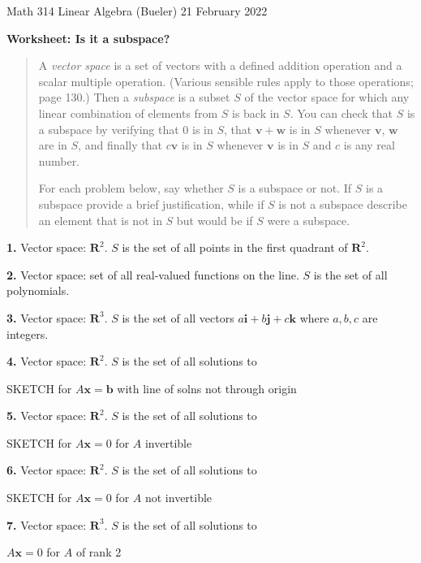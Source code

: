 \documentclass[12pt]{amsart}
\newcommand{\bb}{\mathbf{b}}
\newcommand{\bi}{\mathbf{i}}
\newcommand{\bj}{\mathbf{j}}
\newcommand{\bk}{\mathbf{k}}
\newcommand{\bv}{\mathbf{v}}
\newcommand{\bw}{\mathbf{w}}
\newcommand{\bx}{\mathbf{x}}
\newcommand{\RR}{\mathbf{R}}
\newcommand{\prob}[1]{\bigskip\noindent\textbf{#1.}\quad }
\begin{document}
\scriptsize \noindent Math 314 Linear Algebra (Bueler) \hfill 21 February 2022 
\normalsize\medskip

\Large\centerline{\textbf{Worksheet: Is it a subspace?}}
\medskip
\normalsize

\thispagestyle{empty}
\begin{quote}
A \emph{vector space} is a set of vectors with a defined addition operation and a scalar multiple operation.  (Various sensible rules apply to those operations; page 130.)  Then a \emph{subspace} is a subset $S$ of the vector space for which any linear combination of elements from $S$ is back in $S$.  You can check that $S$ is a subspace by verifying that $0$ is in $S$, that $\bv+\bw$ is in $S$ whenever $\bv$, $\bw$ are in $S$, and finally that $c\bv$ is in $S$ whenever $\bv$ is in $S$ and $c$ is any real number.

For each problem below, say whether $S$ is a subspace or not.  If $S$ is a subspace provide a brief justification, while if $S$ is not a subspace describe an element that is not in $S$ but would be if $S$ were a subspace.
\end{quote}

\prob{1}  Vector space: $\RR^2$.  $S$ is the set of all points in the first quadrant of $\RR^2$.
\vfill

\prob{2}  Vector space: set of all real-valued functions on the line.  $S$ is the set of all polynomials.
\vfill

\prob{3}  Vector space: $\RR^3$.  $S$ is the set of all vectors $a\bi + b \bj + c\bk$ where $a,b,c$ are integers.
\vfill

\clearpage \newpage
\prob{4}  Vector space: $\RR^2$.  $S$ is the set of all solutions to

SKETCH for $A\bx=\bb$ with line of solns not through origin
\vfill

\prob{5}  Vector space: $\RR^2$.  $S$ is the set of all solutions to

SKETCH for $A\bx=0$ for $A$ invertible
\vfill

\prob{6}  Vector space: $\RR^2$.  $S$ is the set of all solutions to 

SKETCH for $A\bx=0$ for $A$ not invertible
\vfill

\prob{7}  Vector space: $\RR^3$.  $S$ is the set of all solutions to 

$A\bx=0$ for $A$ of rank 2
\vfill
\end{document}
